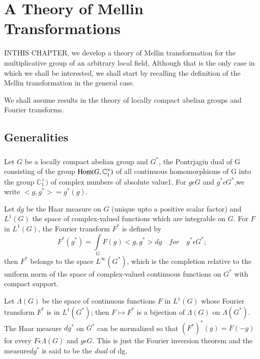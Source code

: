 \chapter{A Theory of Mellin Transformations}\label{chap1}

IN\pageoriginale THIS CHAPTER, we develop a theory of Mellin transformation for the
multiplicative group of an arbitrary local field, Although that is the
only case in which we shall be interested, we shall start by recalling
the definition of the Mellin transformation in the general case.

We shall assume results in the theory of locally compact abelian
groups and Fourier transforms.

\section{Generalities}\label{chap1:sec1}

\subsection{}\label{chap1:sec1:subsec1} 
Let $G$ be a locally compact abelian group and $G^\ast$, the Pontrjagin
dual of G consisting of the group $\operatorname{Hom}(G,\mathbb{C}_1^\times)$ of all
continuous homomorphisms of G into the group $\mathbb{C}_1^\times)$ of
complex numbers of absolute value1. For $g\epsilon G$ and $g^\ast
\epsilon G^\ast$,we write $<g,g^\ast>=g^\ast(g)$.

Let $dg$ be the Haar measure on $G$ (unique upto a positive scalar factor)
and $L^1(G)$ the space of complex-valued functions which are
integrable on $G$. For $F$ in $L^1(G)$, the Fourier transform $F^\ast$ is
defined by 
\begin{equation*}
  F^\ast(g^\ast)=\int\limits_GF(g)<g, g^\ast>dg\quad for\quad
  g^\ast\epsilon G^\ast; 
\end{equation*}
then $F^\ast$ belongs to the space $L^\infty(G^\ast)$, which is the
completion relative to the uniform norm of the space of complex-valued
continuous functions on $G^\ast$ with compact support. 

Let $\Lambda(G)$ be the space of continuous functions $F$ in $L^1(G)$
whose Fourier transform $F^\ast$ is in $L^1(G^\ast)$; then $F
\mapsto F^\ast$ is a bijection of $\Lambda(G)$ on
$\Lambda(G^\ast)$. The Haar measure $dg^\ast$ on $G^\ast$ can be
normalized so that $(F^\ast)^{\ast}(g)=F(-g)$ for every
$F\epsilon\Lambda(G)$ and $g\epsilon G$. This is just the Fourier
inversion theorem and the measure\pageoriginale $dg^{\ast}$ is said to be the
{\em dual} of dg. 

